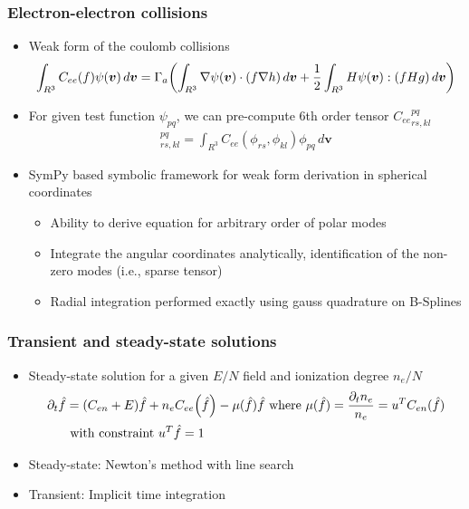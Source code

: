 \documentclass[mathserif, aspectratio=169]{beamer}
\newcommand{\vect}[1]{\boldsymbol{#1}}
\newcommand{\of}[1]{\mleft( #1 \mright)}
\newcommand{\diff}[1]{\, d#1}
\begin{document}
\begin{frame}
	\frametitle{Electron-electron collisions}
	\begin{itemize}
		\item Weak form of the coulomb collisions
		\begin{align}
			\int_{R^3} C_{ee}(f) \psi(\vect{v})\diff{\vect{v}} = \Gamma_a \of{\int_{R^3} \nabla \psi\of{\vect{v}} \cdot (f \nabla h ) \diff{\vect{v}}  + \frac{1}{2} \int_{R^3} H\psi\of{\vect{v}} : \of{f H g} \diff{\vect{v}}} 
		\end{align}
		\item For given test function $\psi_{pq}$, we can pre-compute 6th order tensor ${C_{ee}}_{rs,kl}^{pq}$
		\begin{align}
			[C_{ee}]_{rs,kl}^{pq} = \int_{R^3} C_{ee}(\phi_{rs}, \phi_{kl}) \phi_{pq} \diff{\vect{v}} 
		\end{align}
		\item SymPy based symbolic framework for weak form derivation in spherical coordinates
		\begin{itemize}
			\item Ability to derive equation for arbitrary order of polar modes
			\item Integrate the angular coordinates analytically, identification of the non-zero modes (i.e., sparse tensor) 
			\item Radial integration performed exactly using gauss quadrature on B-Splines
		\end{itemize}
	\end{itemize}
\end{frame}

\begin{frame}
	\frametitle{Transient and steady-state solutions}
	\begin{itemize}
		\item Steady-state solution for a given $E/N$ field and ionization degree $n_e/N$ 
		\begin{align}
			\partial_t {\hat{f}} &=(C_{en}+E)\hat{f} + n_e C_{ee}\of{\hat{f}} - \mu(\hat{f}) \hat{f} \text{ where } \mu(\hat{f}) = \frac{\partial_t n_e}{n_e} = u^T C_{en}(\hat{f})\\
			&\text{ with constraint } u^T \hat{f} = 1 \nonumber 
		\end{align}
		\item Steady-state: Newton's method with line search
		\item Transient: Implicit time integration
	\end{itemize}
\end{frame}
\end{document}
